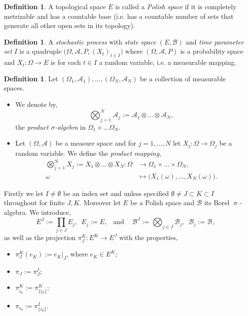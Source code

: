 \documentclass[a4paper, 12pt]{report}
\theoremstyle{remark}
\theoremstyle{definition}
\newtheorem{definition}[theorem]{Definition}
\begin{document}
\begin{definition}
A topological space $E$ is called a \emph{Polish space} if it is completely metrizable and has a countable base (i.e. has a countable number of sets that generate all other open sets in its topology).
\end{definition}

\begin{definition}
A \emph{stochastic process} with \emph{state space} $(E, \mathcal{B})$ and \emph{time parameter set} $I$ is a quadruple $\big(\Omega, \mathcal{A}, P, (X_t)_{t \in I}\big)$ where $(\Omega, \mathcal{A}, P)$ is a probability space and $X_t : \Omega \to E$ is for each $t \in I$ a random variable, i.e. a measurable mapping.
\end{definition}

\begin{definition}
Let $(\Omega_1, \mathcal{A}_1), \dots, (\Omega_N, \mathcal{A}_N)$ be a collection of measurable spaces.
\begin{itemize}
\item We denote by,
$$
\bigotimes_{j = 1}^N\mathcal{A}_j := \mathcal{A}_1 \otimes \dots \otimes \mathcal{A}_N,
$$
the \emph{product $\sigma$-algebra} in $\Omega_1 \times \dots \Omega_N$.

\item Let $(\Omega, \mathcal{A})$ be a measure space and for $j = 1, \dots, N$ let $X_j : \Omega \to \Omega_j$ be a random variable.  We define the \emph{product mapping},
$$
\begin{aligned}
\bigotimes_{j = 1}^NX_j := X_1 \otimes \dots \otimes X_N : \Omega & \to \Omega_1 \times \dots \times \Omega_N,\\
\omega & \mapsto \big(X_1(\omega), \dots, X_N(\omega)\big).
\end{aligned}
$$
\end{itemize}
\end{definition}
Firstly we let $I \ne \emptyset$ be an index set and unless specified $\emptyset \ne J \subset K \subset I$ throughout for finite $J, K$.  Moreover let $E$ be a Polish space and $\mathcal{B}$ its Borel $\upsigma$-algebra.  We introduce,
$$
E^J := \prod_{j \in J}E_j, \,\,\, E_j := E, \,\,\,\,\, \text{and } \,\,\,\,\, \mathcal{B}^J := \bigotimes_{j \in J}\mathcal{B}_j, \,\,\, \mathcal{B}_j := \mathcal{B},
$$
as well as the projection $\pi_J^K : E^K \to E^J$ with the properties,
\begin{itemize}
\item $\pi_J^K(e_K) := e_K|_J$, where $e_K \in E^K$;

\item $\pi_J := \pi_J^I$;

\item $\pi_{i_0}^K := \pi_{\{i_0\}}^K$;

\item $\pi_{i_0} := \pi_{\{i_0\}}^I$.
\end{itemize}
\end{document}
